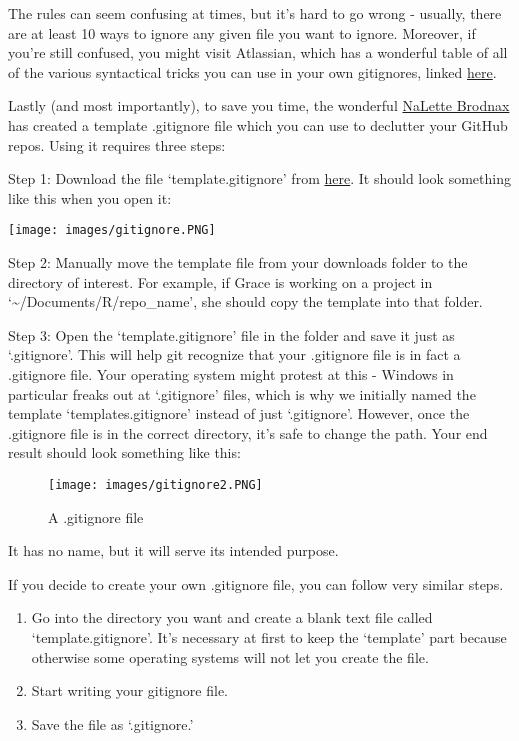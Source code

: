 \documentclass[
]{book}
\begin{document}
The rules can seem confusing at times, but it's hard to go wrong - usually, there are at least 10 ways to ignore any given file you want to ignore. Moreover, if you're still confused, you might visit Atlassian, which has a wonderful table of all of the various syntactical tricks you can use in your own gitignores, linked \href{https://www.atlassian.com/git/tutorials/gitignore}{here}.

Lastly (and most importantly), to save you time, the wonderful \href{https://www.iq.harvard.edu/people/nalette-brodnax}{NaLette Brodnax} has created a template .gitignore file which you can use to declutter your GitHub repos. Using it requires three steps:

Step 1: Download the file `template.gitignore' from \href{https://github.com/IQSS/Rbuild/blob/master/template.gitignore}{here}. It should look something like this when you open it:

\texttt{[image: images/gitignore.PNG]}

Step 2: Manually move the template file from your downloads folder to the directory of interest. For example, if Grace is working on a project in `\textasciitilde/Documents/R/repo\_name', she should copy the template into that folder.

Step 3: Open the `template.gitignore' file in the folder and save it just as `.gitignore'. This will help git recognize that your .gitignore file is in fact a .gitignore file. Your operating system might protest at this - Windows in particular freaks out at `.gitignore' files, which is why we initially named the template `templates.gitignore' instead of just `.gitignore'. However, once the .gitignore file is in the correct directory, it's safe to change the path. Your end result should look something like this:

\begin{figure}
\centering
\texttt{[image: images/gitignore2.PNG]}
\caption{A .gitignore file}
\end{figure}

It has no name, but it will serve its intended purpose.

If you decide to create your own .gitignore file, you can follow very similar steps.

\begin{enumerate}
\def\labelenumi{\arabic{enumi}.}
\item
  Go into the directory you want and create a blank text file called `template.gitignore'. It's necessary at first to keep the `template' part because otherwise some operating systems will not let you create the file.
\item
  Start writing your gitignore file.
\item
  Save the file as `.gitignore.'
\end{enumerate}
\end{document}
